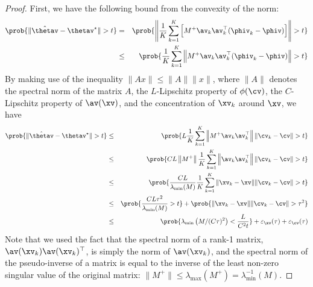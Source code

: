 \documentclass[twoside,11pt]{article}
\begin{document}
\begin{proof}
First, we have the following bound from the convexity of the norm:
\begin{eqnarray}
    \prob{\|\hat\thetav - \thetav^\star\| > t}
    &=& \prob{\left\|\frac{1}{K} \sum_{k=1}^K\left[M^{+} \av_k \av_k^\top (\phiv_k - \phiv)\right]\right\| > t} \\
    &\leq& \prob{\frac{1}{K} \sum_{k=1}^K \left\|M^{+} \av_k \av_k^\top (\phiv_k - \phiv)\right\| > t}
\end{eqnarray}
By making use of the inequality $\|Ax\| \leq \|A\| \|x\|$, where $\|A\|$ denotes the spectral norm of the matrix $A$, the $L$-Lipschitz property of $\phi(\cv)$, the $C$-Lipschitz property of $\av(\xv)$, and the concentration of $\xv_k$ around $\xv$, we have
\begin{eqnarray}
    \prob{\|\hat\thetav - \thetav^\star\| > t}
    &\leq& \prob{L \frac{1}{K} \sum_{k=1}^K \left\|M^{+} \av_k \av_k^\top\right\| \|\cv_k - \cv\| > t} \\
    &\leq& \prob{C L \left\|M^{+}\right\| \frac{1}{K} \sum_{k=1}^K \left\|\av_k \av_k^\top\right\| \|\cv_k - \cv\| > t} \\
    &\leq& \prob{\frac{C L}{\lambda_\mathrm{min}(M)} \frac{1}{K} \sum_{k=1}^K \|\xv_k - \xv\| \|\cv_k - \cv\| > t} \\
    &\leq& \prob{\frac{C L \tau^2}{\lambda_\mathrm{min}(M)} > t} + \prob{\|\xv_k - \xv\| \|\cv_k - \cv\| > \tau^2} \\
    &\leq& \prob{\lambda_\mathrm{min}\left(M / (C \tau)^2\right) < \frac{L}{C^2 t}} + \varepsilon_\xv(\tau) + \varepsilon_\cv(\tau)
\end{eqnarray}
Note that we used the fact that the spectral norm of a rank-1 matrix, $\av(\xv_k) \av(\xv_k)^\top$, is simply the norm of $\av(\xv_k)$, and the spectral norm of the pseudo-inverse of a matrix is equal to the inverse of the least non-zero singular value of the original matrix: $\|M^+\| \leq \lambda_\mathrm{max}(M^+) = \lambda^{-1}_\mathrm{min}(M)$.


\end{proof}
\end{document}
